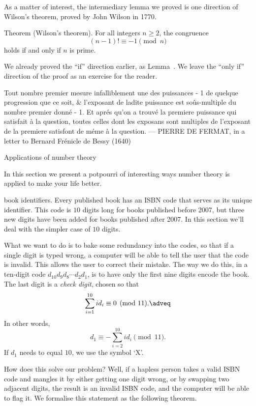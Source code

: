As a matter of interest, the intermediary lemma we proved is one direction of Wilson's theorem, proved
by John Wilson in 1770.

\parenproclaim Theorem {\advthm} (Wilson's theorem).
For all integers $n\ge 2$, the congruence
$$(n-1)!\equiv -1\pmod n$$
holds if and only if $n$ is prime.

\proof We already proved the ``if'' direction earlier, as Lemma~{\lemhalfwilson}.
We leave the ``only if'' direction of the proof as an exercise for the reader.\slug

\bigskip
\begingroup\obeylines\eightssi
\hfill Tout nombre premier mesure infalliblement
\hfill une des puissances - 1 de quelque progression que ce soit,
\hfill \& l'exposant de ladite puissance est so\^us-multiple du nombre premier donn\'e - 1.
\hfill Et apr\'es qu'on a trouv\'e la premiere puissance qui satisfait \`a la question,
\hfill toutes celles dont les exposans sont multiples de l'exposant de la premiere
\hfill satisfont de m\'eme \`a la question.
\eightss
\smallskip
\hfill --- PIERRE DE FERMAT, {\eightssi in a letter to Bernard Fr\'enicle de Bessy} (1640)
\endgroup%
\bigskip\goodbreak

\advsect Applications of number theory

In this section we present a potpourri of interesting ways number theory is applied to make your life better.

\medskip{} book identifiers. Every published book has an
{\mc ISBN} code that serves as its
unique identifier. This code is $10$ digits long for books published before 2007, but three new digits
have been added for books published after 2007. In this section we'll deal with the simpler case of $10$ digits.

What we want to do is to bake some redundancy into the codes, so that if a single digit is typed wrong,
a computer will be able to tell the user that the code is invalid. This allows the user to correct their
mistake. The way we do this, in a ten-digit code $d_{10}d_9d_8\cdots d_2d_1$,
is to have only the first nine digits encode the book. The last digit is a {\it check digit},
chosen so that
\edef\eqvalidisbn{\the\eqcount}
$$\sum_{i=1}^{10} i d_i \equiv 0 \pmod{11}.\adveq$$
In other words,
$$d_1\equiv -\sum_{i=2}^{10} id_i \pmod{11}.$$
If $d_1$ needs to equal $10$, we use the symbol `X'.

How does this solve our problem? Well, if a hapless person takes a valid {\mc ISBN} code
and mangles it by either getting one digit wrong, or by swapping two adjacent digits,
the result is an invalid {\mc ISBN} code, and the computer will be able to flag it.
We formalise this statement as the following theorem.

